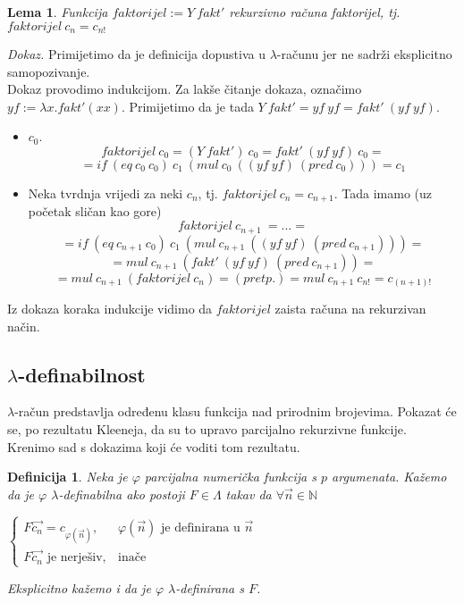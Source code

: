 \documentclass[a4paper,12pt]{article}
\newtheorem{lem}[thm]{Lema}
\newtheorem{defn}[thm]{Definicija}
\newenvironment{proof}{\textit{Dokaz.}}{\hfill}
\begin{document}
\begin{lem} Funkcija $faktorijel := Y\ fakt'$ rekurzivno računa faktorijel, tj. $faktorijel\ c_n = c_{n!}$
\end{lem}
\begin{proof} Primijetimo da je definicija dopustiva u $\lambda$-računu jer ne sadrži eksplicitno samopozivanje.\\
Dokaz provodimo indukcijom. Za lakše čitanje dokaza, označimo $yf := \lambda x. fakt' (x x)$. Primijetimo da je tada $Y\ fakt' = yf\ yf = fakt'\ (yf\ yf)$.
\begin{itemize}
	\item $c_0$.
		\[ faktorijel\ c_0 = (Y\ fakt')\ c_0 = fakt'\ (yf\ yf)\ c_0 = \] 
		\[ = if\ (eq\ c_0\ c_0)\ c_1\ (mul\ c_0\ ((yf\ yf)\ (pred\ c_0))) = c_1 \]
	\item Neka tvrdnja vrijedi za neki $c_n$, tj. $faktorijel\ c_n = c_{n+1}$. Tada imamo (uz početak sličan kao gore)
		\[ faktorijel\ c_{n+1}\ = ... = \]
		\[ = if\ (eq\ c_{n+1}\ c_0)\ c_1\ (mul\ c_{n+1}\ ((yf\ yf)\ (pred\ c_{n+1}))) = \]
		\[ = mul\ c_{n+1}\ (fakt'\ (yf\ yf)\ (pred\ c_{n+1})) = \] 
		\[ = mul\ c_{n+1}\ (faktorijel\ c_n) = (pretp.) =  mul\ c_{n+1}\ c_{n!} = c_{(n+1)!} \] 
\end{itemize}
Iz dokaza koraka indukcije vidimo da $faktorijel$ zaista računa na rekurzivan način.
\end{proof}

\subsection{$\lambda$-definabilnost}

$\lambda$-račun predstavlja određenu klasu funkcija nad prirodnim brojevima. Pokazat će se, po rezultatu Kleeneja, da su to upravo parcijalno rekurzivne funkcije. Krenimo sad s dokazima koji će voditi tom rezultatu.

\begin{defn}
Neka je $\varphi$ parcijalna numerička funkcija s $p$ argumenata. Kažemo da je $\varphi$ $\lambda$-definabilna ako postoji $F \in \Lambda$ takav da $\forall \overrightarrow{n} \in \mathbb{N}$
\begin{center}
$\begin{cases}
F \overrightarrow{c_n} = c_{\varphi (\overrightarrow{n})},& \varphi (\overrightarrow{n}) \mbox{ je definirana u } \overrightarrow{n}\\
F \overrightarrow{c_n} \mbox{ je nerješiv},& \mbox{inače}
\end{cases}$
\end{center}
Eksplicitno kažemo i da je $\varphi$ $\lambda$-definirana s $F$.
\end{defn}
\end{document}
